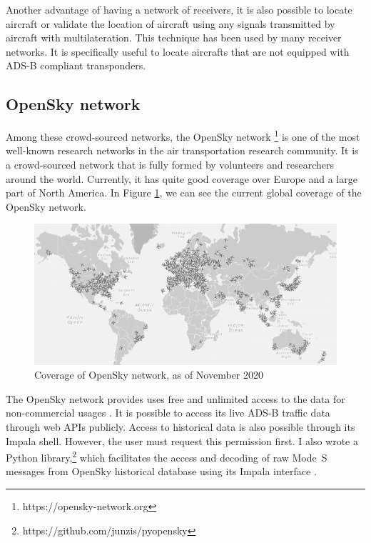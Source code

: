 Another advantage of having a network of receivers, it is also possible to locate aircraft or validate the location of aircraft using any signals transmitted by aircraft with multilateration\cite{kaune2012}. This technique has been used by many receiver networks. It is specifically useful to locate aircrafts that are not equipped with ADS-B compliant transponders.

\subsection{OpenSky network}

Among these crowd-sourced networks, the OpenSky network \footnote{https://opensky-network.org} is one of the most well-known research networks in the air transportation research community. It is a crowd-sourced network that is fully formed by volunteers and researchers around the world. Currently, it has quite good coverage over Europe and a large part of North America. In Figure \ref{fig:opensky_coverage}, we can see the current global coverage of the OpenSky network.

\begin{figure}[ht]
    \centering
    \includegraphics[width=\columnwidth]{figures/conclusion/opensky.png}
    \caption{Coverage of OpenSky network, as of November 2020}
    \label{fig:opensky_coverage}
\end{figure}

The OpenSky network provides uses free and unlimited access to the data for non-commercial usages \cite{schafer2014opensky}. It is possible to access its live ADS-B traffic data through web APIs publicly. Access to historical data is also possible through its Impala shell. However, the user must request this permission first. I also wrote a Python library,\footnote{https://github.com/junzis/pyopensky} which facilitates the access and decoding of raw Mode~S messages from OpenSky historical database using its Impala interface \cite{sun2019pyopensky}. 

